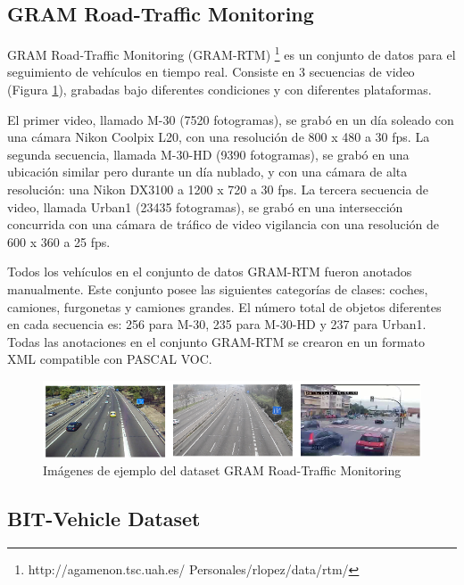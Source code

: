 \subsection{GRAM Road-Traffic Monitoring}

GRAM Road-Traffic Monitoring (GRAM-RTM) \footnote{http://agamenon.tsc.uah.es/
Personales/rlopez/data/rtm/} \cite{gram-tracking} \cite{gram} es un conjunto de datos para el seguimiento de vehículos en tiempo real. Consiste en 3 secuencias de video (Figura \ref{fig.gram}), grabadas bajo diferentes condiciones y con diferentes plataformas.

El primer video, llamado M-30 (7520 fotogramas), se grabó en un día soleado con una cámara Nikon Coolpix L20, con una resolución de 800 x 480 a 30 \acrshort{fps}. La segunda secuencia, llamada M-30-HD (9390 fotogramas), se grabó en una ubicación similar pero durante un día nublado, y con una cámara de alta resolución: una Nikon DX3100 a 1200 x 720 a 30 \acrshort{fps}. La tercera secuencia de video, llamada Urban1 (23435 fotogramas), se grabó en una intersección concurrida con una cámara de tráfico de video vigilancia con una resolución de 600 x 360 a 25 \acrshort{fps}.

Todos los vehículos en el conjunto de datos GRAM-RTM fueron anotados manualmente. Este conjunto posee las siguientes categorías de clases: coches, camiones, furgonetas y camiones grandes. El número total de objetos diferentes en cada secuencia es: 256 para M-30, 235 para M-30-HD y 237 para Urban1. Todas las anotaciones en el conjunto GRAM-RTM se crearon en un formato XML compatible con PASCAL VOC.

\begin{figure}
\begin{center}
	\includegraphics[width=1\textwidth]{figures/Estado_arte/gram.png}
   \caption{Imágenes de ejemplo del dataset GRAM Road-Traffic Monitoring}
	\label{fig.gram}
\end{center}
\end{figure}

\subsection{BIT-Vehicle Dataset}

